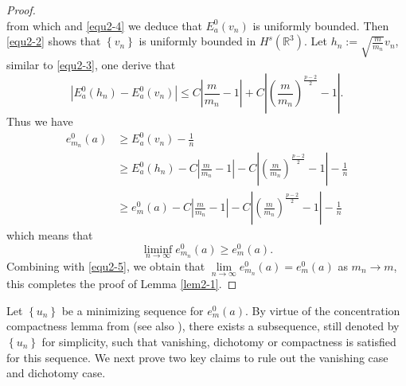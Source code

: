 \documentclass[reqno, 11pt]{amsart} %
\numberwithin{equation}{section}
\begin{document}
\begin{proof}
\begin{equation*}
		\end{equation*} 
		from which and \eqref{equ2-4} we deduce that $E^{0}_{a}(v_{n})$ is uniformly bounded. Then \eqref{equ2-2} shows that $\left\lbrace v_{n}\right\rbrace $ is uniformly bounded in $H^{s}(\mathbb{R}^{3})$. Let $h_{n}:=\sqrt{\frac{m}{m_{n}}}v_{n}$, similar to \eqref{equ2-3}, one derive that
		\begin{equation*}
			\left| E^{0}_{a}(h_{n})-E^{0}_{a}(v_{n})\right| \leq C\left| \frac{m}{m_{n}}-1\right|+C\left| \left( \frac{m}{m_{n}}\right) ^{\frac{p-2}{2}}-1\right|.
		\end{equation*} 
		Thus we have
		\begin{equation*}
			\begin{aligned}
				e^{0}_{m_{n}}(a)&\geq E^{0}_{a}(v_{n})-\frac{1}{n}\\
				&\geq E^{0}_{a}(h_{n})-C\left| \frac{m}{m_{n}}-1\right|-C\left| \left( \frac{m}{m_{n}}\right) ^{\frac{p-2}{2}}-1\right|-\frac{1}{n}\\
				&\geq e^{0}_{m}(a)-C\left| \frac{m}{m_{n}}-1\right|-C\left| \left( \frac{m}{m_{n}}\right) ^{\frac{p-2}{2}}-1\right|-\frac{1}{n}
			\end{aligned}
		\end{equation*}
		which means that 
		\begin{equation*}
			\liminf_{n\rightarrow\infty}e^{0}_{m_{n}}(a)\geq e^{0}_{m}(a).
		\end{equation*}
		Combining with \eqref{equ2-5}, we obtain that $\lim\limits_{n\rightarrow\infty}e^{0}_{m_{n}}(a)= e^{0}_{m}(a)$
		as $m_{n}\rightarrow m$, this completes the proof of Lemma \ref{lem2-1}.
	\end{proof}
	
	Let $\left\lbrace u_{n}\right\rbrace $ be a minimizing sequence for $e^{0}_{m}(a)$. By virtue of the concentration compactness lemma from \cite[Lemma 2.4]{W} (see also \cite[Lemma 2.4]{F}), there exists a subsequence, still denoted by $\left\lbrace u_{n}\right\rbrace $ for simplicity, such that vanishing, dichotomy or compactness is satisfied for this sequence. We next prove two key claims to rule out the vanishing case and dichotomy case.
	
\end{document}
